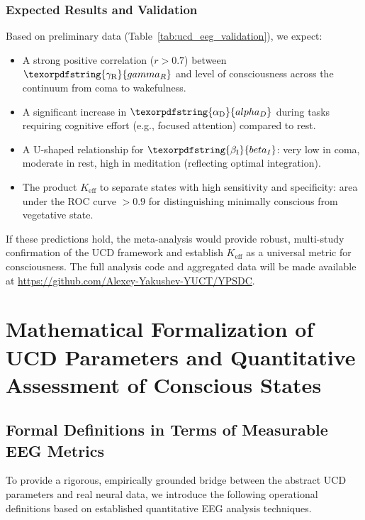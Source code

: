 \documentclass[12pt,a4paper]{article}
\DeclareRobustCommand{\alD}{\texorpdfstring{\ensuremath{\alpha_{\mathrm{D}}}}{alpha_D}}
\DeclareRobustCommand{\beI}{\texorpdfstring{\ensuremath{\beta_{\mathrm{I}}}}{beta_I}}
\DeclareRobustCommand{\gaR}{\texorpdfstring{\ensuremath{\gamma_{\mathrm{R}}}}{gamma_R}}
\newcommand{\Ke}{K_{\mathrm{eff}}}
\begin{document}
	\subsubsection{Expected Results and Validation}
	Based on preliminary data (Table~\ref{tab:ucd_eeg_validation}), we expect:
	\begin{itemize}
		\item A strong positive correlation (\(r > 0.7\)) between \(\gaR\) and level of consciousness across the continuum from coma to wakefulness.
		\item A significant increase in \(\alD\) during tasks requiring cognitive effort (e.g., focused attention) compared to rest.
		\item A U-shaped relationship for \(\beI\): very low in coma, moderate in rest, high in meditation (reflecting optimal integration).
		\item The product \(\Ke\) to separate states with high sensitivity and specificity: area under the ROC curve \(> 0.9\) for distinguishing minimally conscious from vegetative state.
	\end{itemize}
	If these predictions hold, the meta-analysis would provide robust, multi-study confirmation of the UCD framework and establish \(\Ke\) as a universal metric for consciousness. The full analysis code and aggregated data will be made available at \url{https://github.com/Alexey-Yakushev-YUCT/YPSDC}.
	
	\section{Mathematical Formalization of UCD Parameters and Quantitative Assessment of Conscious States}
	\label{sec:math_formalization}
	
	\subsection{Formal Definitions in Terms of Measurable EEG Metrics}
	\label{subsec:formal_defs}
	
	To provide a rigorous, empirically grounded bridge between the abstract UCD parameters and real neural data, we introduce the following operational definitions based on established quantitative EEG analysis techniques.
	
\end{document}

